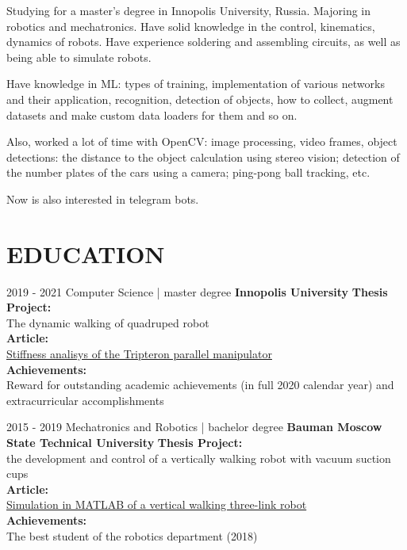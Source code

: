 \documentclass[]{friggeri-cv_reccius-experiment}
\begin{document}
Studying for a master's degree in Innopolis University, Russia. Majoring in robotics and mechatronics. Have solid knowledge in the control, kinematics, dynamics of robots. Have experience soldering and assembling circuits, as well as being able to simulate robots.  

Have knowledge in ML: types of training, implementation of various networks and their application, recognition, detection of objects, how to collect, augment datasets and make custom data loaders for them and so on.

Also, worked a lot of time with OpenCV: image processing, video frames, object detections:  the distance to the object calculation using stereo vision; detection of the number plates of the cars using a camera; ping-pong ball tracking, etc.

Now is also interested in telegram bots. 

\section{EDUCATION}
\begin{entrylist}
    
  \entry
    {2019 - 2021\enspace}
    {Computer Science | }{\Large\thinspace\normalsize master degree}
    {\normalsize\textbf{\color{ipsgreen}\faMapMarker\space Innopolis University}}
    {\textbf{Thesis Project:} \\The dynamic walking of quadruped robot \\
    \textbf{Article:} \\\href{https://ieeexplore.ieee.org/document/9290208}{Stiffness analisys of the Tripteron parallel manipulator \faMousePointer} \\
    \textbf{Achievements:} \\ Reward for outstanding academic achievements (in full 2020 calendar year) and extracurricular accomplishments
    }

  \entry
    {2015 - 2019\enspace}
    {Mechatronics and Robotics | } {\Large\thinspace\normalsize bachelor degree}
    {\normalsize\textbf{\color{ipsgreen}\faMapMarker\space Bauman Moscow State Technical University}
    }
    {\textbf{Thesis Project:} \\the development and control of a vertically walking robot with vacuum suction cups \\
    \textbf{Article:} \\\href{https://aip.scitation.org/doi/abs/10.1063/1.5140108}{Simulation in MATLAB of a vertical walking three-link robot \faMousePointer} \\
    \textbf{Achievements:} \\The best student of the robotics department (2018)}
\end{entrylist}
\end{document}
